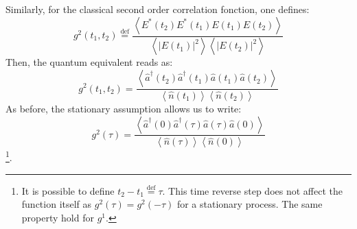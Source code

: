 \documentclass[12pt]{report}
\begin{document}
Similarly, for the classical second order correlation fonction, one defines:
\begin{equation}
{\displaystyle g ^{2}(t_{1},t_{2})\stackrel{\text{def}}{=}{\frac {\left\langle E^{*}(t_{2})E^{*}(t_{1})E(t_{1})E(t_{2})\right\rangle }{\left\langle \left|E(t_{1})\right|^{2}\right\rangle \left\langle \left|E(t_{2})\right|^{2}\right\rangle}}}
\end{equation}
Then, the quantum equivalent reads as:
\begin{equation}
{\displaystyle g ^{2}(t_1, t_2)={\frac {\left\langle \hat{a}^\dagger(t_2)\hat{a}^\dagger(t_1)\hat{a}(t_1)\hat{a}(t_2)\right\rangle }{\left\langle \hat{n}(t_1) \right\rangle \left\langle \hat{n}(t_2) \right\rangle}}}
\end{equation}
As before, the stationary assumption allows us to write:
\begin{equation}
{\displaystyle g ^{2}(\tau)={\frac {\left\langle \hat{a}^\dagger(0)\hat{a}^\dagger(\tau)\hat{a}(\tau)\hat{a}(0)\right\rangle }{\left\langle \hat{n}(\tau) \right\rangle \left\langle \hat{n}(0) \right\rangle}}}
\end{equation}
\footnote{It is possible to define $t_2 - t_1 \stackrel{\text{def}}{=} \tau$. This time reverse step does not affect the function itself as $g^2(\tau) = g^2(-\tau)$ for a stationary process. The same property hold for $g^1$.}.
\end{document}
